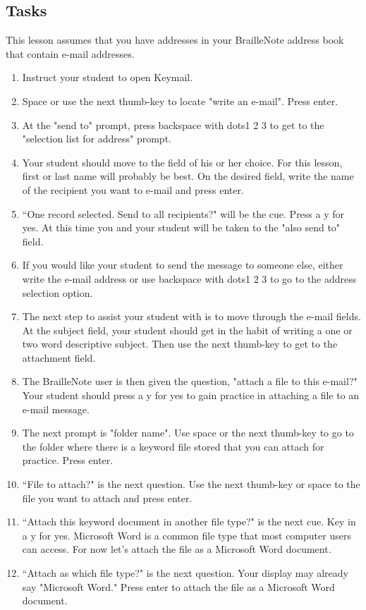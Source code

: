 \documentclass[10pt,letterpaper,twoside]{report}
\begin{document}
{{{\subsection{Tasks}
This lesson assumes that you have addresses in your BrailleNote address book that contain e-mail addresses.
\begin{enumerate}
	\item Instruct your student to open Keymail.
	\item Space or use the next thumb-key to locate "write an e-mail".  Press enter.
	\item At the "send to" prompt, press backspace with dots1 2 3 to get to the "selection list for address" prompt.
	\item Your student should move to the field of his or her choice.  For this lesson, first or last name will probably be best.  On the desired field, write the name of the recipient you want to e-mail and press enter.
	\item ``One record selected. Send to all recipients?" will be the cue.  Press a y for yes.  At this time you and your student will be taken to the "also send to" field.
	\item If you would like your student to send the message to someone else, either write the e-mail address or use backspace with dots1 2 3 to go to the address selection option.
	\item The next step to assist your student with is to move through the e-mail fields.  At the subject field, your student should get in the habit of writing a one or two word descriptive subject.  Then use the next thumb-key to get to the attachment field.
	\item The BrailleNote user is then given the question, "attach a file to this e-mail?" Your student should press a y for yes to gain practice in attaching a file to an e-mail message.
	\item The next prompt is "folder name".  Use space or the next thumb-key to go to the folder where there is a keyword file stored that you can attach for practice. Press enter.
	\item ``File to attach?" is the next question.  Use the next thumb-key or space to the file you want to attach and press enter.
	\item ``Attach this keyword document in another file type?" is the next cue. Key in a y for yes.  Microsoft Word is a common file type that most computer users can access.  For now let's attach the file as a Microsoft Word document.
	\item ``Attach as which file type?" is the next question.  Your display may already say "Microsoft Word." Press enter to attach the file as a Microsoft Word document.

\end{enumerate}}}}
\end{document}
